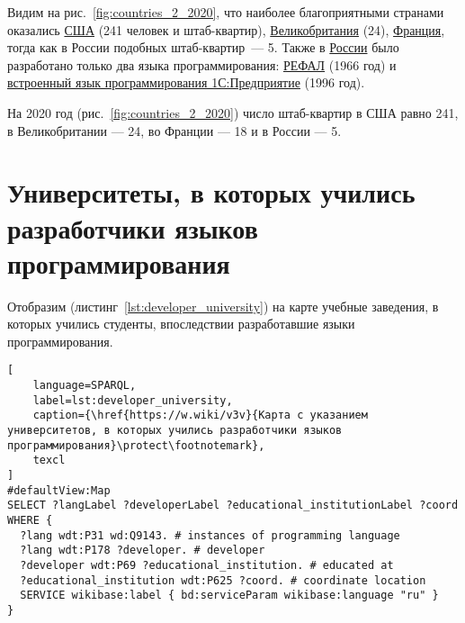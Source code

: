 Видим на рис.~\ref{fig:countries_2_2020}, что наиболее благоприятными странами оказались \href{https://en.wikipedia.org/wiki/USA}{США} (241 человек и штаб-квартир), \href{https://ru.wikipedia.org/wiki/Великобритания}{Великобритания} (24), \href{https://ru.wikipedia.org/wiki/Франция}{Франция}, тогда как в России подобных штаб-квартир~--- 5. Также в \href{https://en.wikipedia.org/wiki/Russia}{России} было разработано только два языка программирования: \href{https://www.wikidata.org/wiki/Q2626418}{РЕФАЛ} (1966 год) и \href{https://www.wikidata.org/wiki/Q65065977}{встроенный язык программирования 1С:Предприятие} (1996 год).

На 2020 год (рис.~\ref{fig:countries_2_2020}) число штаб-квартир в США равно 241, в Великобритании — 24, во Франции — 18 и в России — 5.

\section{Университеты, в которых учились разработчики языков программирования}
Отобразим (листинг~\ref{lst:developer_university}) на карте учебные заведения, в которых учились студенты, впоследствии разработавшие языки программирования.

\begin{lstlisting}[
	language=SPARQL,
	label=lst:developer_university,
	caption={\href{https://w.wiki/v3v}{Карта с указанием университетов, в которых учились разработчики языков программирования}\protect\footnotemark},
	texcl
]
#defaultView:Map
SELECT ?langLabel ?developerLabel ?educational_institutionLabel ?coord
WHERE {
  ?lang wdt:P31 wd:Q9143. # instances of programming language
  ?lang wdt:P178 ?developer. # developer
  ?developer wdt:P69 ?educational_institution. # educated at
  ?educational_institution wdt:P625 ?coord. # coordinate location
  SERVICE wikibase:label { bd:serviceParam wikibase:language "ru" } 	
}
\end{lstlisting}

